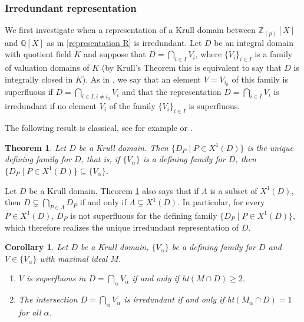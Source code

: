 \documentclass[10pt]{article}
\numberwithin{equation}{section}
\newtheorem{Thm}[equation]{Theorem}
\newtheorem{Cor}[equation]{Corollary}
\theoremstyle{definition}
\theoremstyle{definition}
\newcommand{\Q}{\mathbb{Q}}
\newcommand{\Z}{\mathbb{Z}}
\newcommand\rc { \color{red}}
\begin{document}
\subsubsection{Irredundant representation}

We first investigate when a representation of a Krull domain between $\Z_{(p)}[X]$ and $\Q[X]$ as in \eqref{representation R} is irredundant. Let $D$ be an integral domain with quotient field $K$ and suppose that $D=\bigcap\limits_{i\in I} V_i$, where $\{V_i\}_{i\in I}$ is a family of valuation domains of $K$ (by Krull's Theorem this is equivalent to say that $D$ is integrally closed in $K$). As in \cite{gh68},
we say that an element $V=V_{i_0}$ of this family is superfluous if $D=\bigcap\limits_{i\in I,i\not=i_0}V_i$ and that the representation $D=\bigcap\limits_{i\in I} V_i$ is irredundant if no element $V_i$ of the family $\{V_i\}_{i\in I}$ is superfluous.

The following result is classical, see for example \cite[Remark on page 296]{n55} or \cite[Corollary 43.9]{Gilm}. 

\begin{Thm} \label{thm9}
Let $D$ be a Krull domain. Then $\{D_P \mid P \in X^1(D)\}$ is
the unique defining family for $D$, that is,
if $\{V_{\alpha}\}$ is a defining family for $D$, then
$\{D_P \mid P \in X^1(D)\} \subseteq \{V_{\alpha}\}$.
\end{Thm}

Let $D$ be a Krull domain.
Theorem \ref{thm9} also says that if $\Lambda$ is a subset of $X^1(D)$,
then $D \subsetneq \bigcap\limits_{P \in \Lambda}D_P$ if and only if $\Lambda \subsetneq X^1(D)$.
In particular, for every $P\in X^1(D)$, $D_P$ is not superfluous for the defining family $\{D_P\mid P\in X^1(D)\}$, 
which therefore realizes the unique irredundant representation of $D$.


\begin{Cor} \label{cor10}
Let $D$ be a Krull domain, $\{V_{\alpha}\}$ be a defining family for $D$
and $V \in \{V_{\alpha}\}$ with maximal ideal $M$.


\begin{enumerate}
\item[{\em (1)}] $V$ is superfluous in $D = \bigcap\limits_{\alpha}V_{\alpha}$
if and only if ht$(M \cap D) \geq 2$.
\item[{\em (2)}] The intersection $D = \bigcap\limits_{\alpha}V_{\alpha}$ is irredundant if and only if ht$(M_{\alpha} \cap D)=1$ for all $\alpha$.
\end{enumerate}
\end{Cor}
\end{document}

